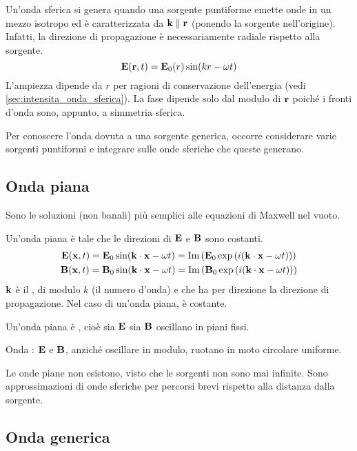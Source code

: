Un'onda sferica si genera quando una sorgente puntiforme emette onde in un mezzo isotropo ed è caratterizzata da $\mathbf{k} \parallel \mathbf{r}$ (ponendo la sorgente nell'origine).
Infatti, la direzione di propagazione è necessariamente radiale rispetto alla sorgente.
\begin{equation}
    \mathbf{E}(\mathbf{r}, t) = \mathbf{E}_0(r) \sin(k r - \omega t)
\end{equation}
L'ampiezza dipende da $r$ per ragioni di conservazione dell'energia (vedi \autoref{sec:intensita_onda_sferica}).
La fase dipende solo dal modulo di $\mathbf{r}$ poiché i fronti d'onda sono, appunto, a simmetria sferica.

Per conoscere l'onda dovuta a una sorgente generica, occorre considerare varie sorgenti puntiformi e integrare sulle onde sferiche che queste generano.

\subsection{Onda piana}

Sono le soluzioni (non banali) più semplici alle equazioni di Maxwell nel vuoto.

Un'onda piana è tale che le direzioni di $\mathbf{E}$ e $\mathbf{B}$ sono costanti.
\begin{subequations}
\begin{gather}
    \mathbf{E}(\mathbf{x}, t) = \mathbf{E}_0 \sin(\mathbf{k} \cdot \mathbf{x} - \omega t)
    = \operatorname{Im}\left( \mathbf{E}_0 \operatorname{exp}\left( i(\mathbf{k} \cdot \mathbf{x} - \omega t) \right) \right) \\
    \mathbf{B}(\mathbf{x}, t) = \mathbf{B}_0 \sin(\mathbf{k} \cdot \mathbf{x} - \omega t)
    = \operatorname{Im}\left( \mathbf{B}_0 \operatorname{exp}\left( i(\mathbf{k} \cdot \mathbf{x} - \omega t) \right) \right)
\end{gather}
\end{subequations}
$\mathbf{k}$ è il , di modulo $k$ (il numero d'onda) e che ha per direzione la direzione di propagazione.
Nel caso di un'onda piana, è costante.

Un'onda piana è , cioè sia $\mathbf{E}$ sia $\mathbf{B}$ oscillano in piani fissi.

Onda : $\mathbf{E}$ e $\mathbf{B}$, anziché oscillare in modulo, ruotano in moto circolare uniforme.

Le onde piane non esistono, visto che le sorgenti non sono mai infinite.
Sono approssimazioni di onde sferiche per percorsi brevi rispetto alla distanza dalla sorgente.

\subsection{Onda generica}

